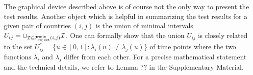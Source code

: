 \documentclass[a4paper,12pt]{article}
\numberwithin{equation}{section}
\begin{document}
{\color{red}
The graphical device described above is of course not the only way to present the test results. Another object which is helpful in summarizing the test results for a given pair of countries $(i,j)$ is the union of minimal intervals $U_{ij} = \cup_{\mathcal{I} \in \mathcal{F}_{\text{reject}}^{\text{min}}(i,j)} \mathcal{I}$. One can formally show that the union $U_{ij}$ is closely related to the set $U_{ij}^* = \{ u \in [0,1]: \lambda_i(u) \ne \lambda_j(u) \}$ of time points where the two functions $\lambda_i$ and $\lambda_j$ differ from each other. For a precise mathematical statement and the technical details, we refer to Lemma ?? in the Supplementary Material. 
}
\end{document}

